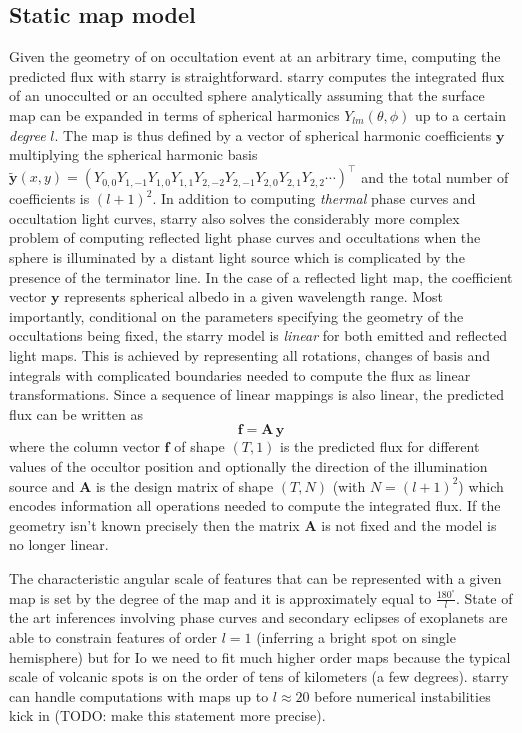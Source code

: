 \documentclass[modern]{aastex62}
\begin{document}
\subsection{Static map model}
\label{ssec:static}
Given the geometry of on occultation event at an arbitrary time, computing the predicted flux with \textsf{starry} is straightforward.
\textsf{starry} computes the integrated flux of an unocculted or an occulted sphere analytically assuming that the surface map can be expanded in terms of spherical harmonics $Y_{lm}(\theta,\phi)$ up to a certain \emph{degree} $l$.
The map is thus defined by a vector of spherical harmonic coefficients $\mathbf{y}$ multiplying the spherical harmonic basis $\tilde{\mathbf{y}}(x, y)=\left(Y_{0,0} Y_{1,-1} Y_{1,0} Y_{1,1} Y_{2,-2} Y_{2,-1} Y_{2,0} Y_{2,1} Y_{2,2} \cdots\right)^{\top}$ and the total number of coefficients is $(l+1)^2$.
In addition to computing \emph{thermal} phase curves and occultation light curves, \textsf{starry} also solves the considerably more complex problem of computing reflected light phase curves and occultations when the sphere is illuminated by a distant light source \citep[Luger et al. 2020 in prep][]{} which is complicated by the presence of the terminator line.
In the case of a reflected light map, the coefficient vector $\mathbf{y}$ represents spherical albedo in a given wavelength range.
Most importantly, conditional on the parameters specifying the geometry of the occultations being fixed, the \textsf{starry} model is \emph{linear} for both emitted and reflected light maps.
This is achieved by representing all rotations, changes of basis and integrals with complicated boundaries needed to compute the flux as linear transformations.
Since a sequence of linear mappings is also linear, the predicted flux can be written as
\begin{equation}
    \mathbf{f}=\mathbf{A}\,\mathbf{y}
    \label{eq:linear_model}
\end{equation}
where the column vector $\mathbf{f}$ of shape $(T, 1)$ is the predicted flux for different values of the occultor position and optionally the direction of the illumination source and $\mathbf{A}$ is the design
matrix of shape $(T, N)$ (with $N=(l+1)^2$) which encodes information all operations needed to compute the integrated flux.
If the geometry isn't known precisely then the matrix $\mathbf{A}$ is not fixed and the model is no longer linear.

The characteristic angular scale of features that can be represented with a given map is set by the degree of the map and it is approximately equal to $\frac{180^\circ}{l}$.
State of the art inferences involving phase curves and secondary eclipses of exoplanets are able to constrain features of order $l=1$ (inferring a bright spot on single hemisphere) but for Io we need to fit much higher order maps because the typical scale of volcanic spots is on the order of tens of kilometers (a few degrees).
\textsf{starry} can handle computations with maps up to $l\approx 20$ before numerical instabilities kick in (TODO: make this statement more precise).
\end{document}
